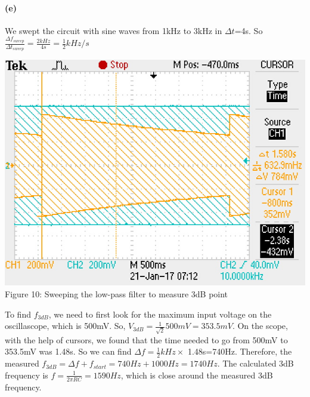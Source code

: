 \documentclass[]{article}
\begin{document}
	\paragraph{ (e)}
	We swept the circuit with sine waves from 1kHz to 3kHz in $\Delta t$=4s. So $\frac{\Delta f_{sweep}}{\Delta t_{sweep}}=\frac{2kHz}{4s}=\frac{1}{2}kHz/s$
	\begin{center}
		\includegraphics[scale=0.7]{e_sweep}\\
		Figure 10: Sweeping the low-pass filter to measure 3dB point
	\end{center}
	To find $f_{3dB}$, we need to first look for the maximum input voltage on the oscillascope, which is 500mV. So, $V_{3dB}=\frac{1}{\sqrt{2}} 500 mV=353.5 mV$. On the scope, with the help of cursors, we found that the time needed to go from 500mV to 353.5mV was 1.48s. So we can find $\Delta f=\frac{1}{2}kHz \times$ 1.48s=740Hz. Therefore, the measured $f_{3dB}=\Delta f+f_{start}= 740 Hz+1000Hz=1740 Hz.$ The calculated 3dB frequency is $f=\frac{1}{2\pi RC}=1590Hz$, which is close around the measured 3dB frequency. \\
	
\end{document}
